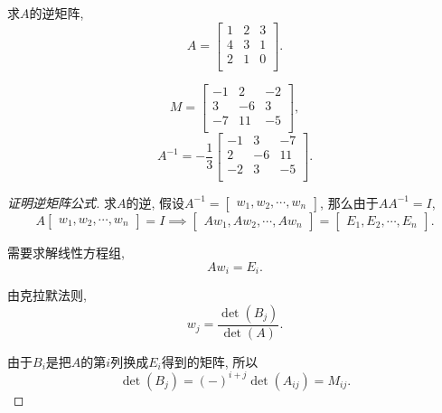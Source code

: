 \begin{example}
    求$A$的逆矩阵, 
    \begin{equation}
      A = \begin{bmatrix}
       1 & 2 & 3\\
       4 & 3 & 1\\
       2 & 1 & 0\\
      \end{bmatrix}.
    \end{equation}

    \begin{equation}
      M = \begin{bmatrix}
       -1 & 2 & -2\\
       3 & -6 & 3\\
       -7 & 11 & -5\\
      \end{bmatrix},
    \end{equation}
    \begin{equation}
      A^{-1} = - \frac{1}{3} \begin{bmatrix}
       -1 & 3 & -7\\
       2 & -6 & 11\\
       -2 & 3 & -5\\
      \end{bmatrix}.
    \end{equation}
\end{example}

\begin{proof}[证明逆矩阵公式]
    求$A$的逆, 假设$A^{-1} = \begin{bmatrix} w_1, w_2, \cdots, w_n \end{bmatrix}$, 那么由于$A A^{-1} = I$,
    \begin{equation}
      A \begin{bmatrix} w_1, w_2, \cdots, w_n \end{bmatrix} = I
      \implies 
      \begin{bmatrix} Aw_1, Aw_2, \cdots, Aw_n \end{bmatrix} = \begin{bmatrix} E_1, E_2, \cdots, E_n \end{bmatrix}.
    \end{equation}
    
    需要求解线性方程组, 
    \begin{equation}
      A w_i = E_i.
    \end{equation}

    由克拉默法则,
    \begin{equation}
      w_{j} = \frac{\det \left( B_j \right)}{\det \left( A \right)}.
    \end{equation}

    由于$B_i$是把$A$的第$i$列换成$E_i$得到的矩阵, 所以
    \begin{equation}
      \det \left( B_j \right) = \left( - \right) ^{i + j} \det \left( A_{i j} \right) = M_{ij}.
    \end{equation}
\end{proof}